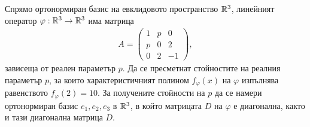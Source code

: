 \documentclass[numbers=endperiod, bibliography=totocnumbered]{scrartcl}
\begin{document}
\begin{exercise}
  Спрямо ортонормиран базис на евклидовото пространство \( \mathbb{R}^3 \), линейният оператор \( \varphi: \mathbb{R}^3 \to \mathbb{R}^3 \) има матрица
  \begin{align*}
    A = \begin{pmatrix}
      1 & p & 0 \\
      p & 0 & 2 \\
      0 & 2 & -1
    \end{pmatrix},
  \end{align*}
  зависеща от реален параметър \( p \). Да се пресметнат стойностите на реалния параметър \( p \), за които характеристичният полином \( f_\varphi(x) \) на \( \varphi \) изпълнява равенството \( f_\varphi(2) = 10 \). За получените стойности на \( p \) да се намери ортонормиран базис \( e_1, e_2, e_3 \) в \( \mathbb{R}^3 \), в който матрицата \( D \) на \( \varphi \) е диагонална, както и тази диагонална матрица \( D \).
\end{exercise}
\end{document}
